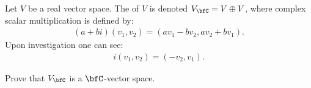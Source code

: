     \begin{definition}
        Let $V$ be a real vector space. The  of $V$ is denoted $V_\bfC = V \oplus V$, where complex scalar multiplication is defined by:
            \begin{equation*}
            \begin{split}
                (a+bi)(v_1,v_2) = (av_1 - bv_2, av_2 + bv_1).
            \end{split}
            \end{equation*}
        Upon investigation one can see:
            \begin{equation*}
            \begin{split}
                i(v_1,v_2) = (-v_2,v_1).
            \end{split}
            \end{equation*}
    \end{definition}

    \begin{exercise}
        Prove that $V_\bfC$ is a $\bfC$-vector space.
    \end{exercise}

